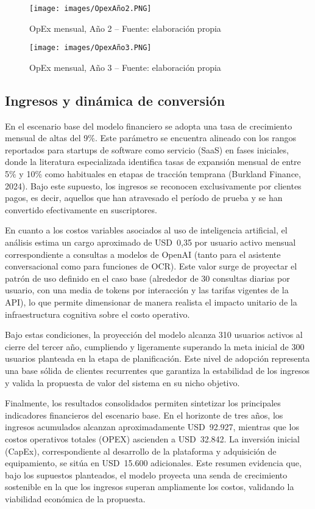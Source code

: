 \begin{figure}[!htbp]
  \centering
  \texttt{[image: images/OpexAño2.PNG]}
  \caption{OpEx mensual, Año 2 -- Fuente: elaboración propia}
  \label{fig:opex-anio2}
\end{figure}

\begin{figure}[!htbp]
  \centering
  \texttt{[image: images/OpexAño3.PNG]}
  \caption{OpEx mensual, Año 3 -- Fuente: elaboración propia}
  \label{fig:opex-anio3}
\end{figure}


\subsection{Ingresos y dinámica de conversión}

En el escenario base del modelo financiero se adopta una tasa de crecimiento mensual de altas del 9\%. Este parámetro se encuentra alineado con los rangos reportados para startups de software como servicio (SaaS) en fases iniciales, donde la literatura especializada identifica tasas de expansión mensual de entre 5\% y 10\% como habituales en etapas de tracción temprana (Burkland Finance, 2024). Bajo este supuesto, los ingresos se reconocen exclusivamente por clientes pagos, es decir, aquellos que han atravesado el período de prueba y se han convertido efectivamente en suscriptores.

En cuanto a los costos variables asociados al uso de inteligencia artificial, el análisis estima un cargo aproximado de USD~0,35 por usuario activo mensual correspondiente a consultas a modelos de OpenAI (tanto para el asistente conversacional como para funciones de OCR). Este valor surge de proyectar el patrón de uso definido en el caso base (alrededor de 30 consultas diarias por usuario, con una media de tokens por interacción y las tarifas vigentes de la API), lo que permite dimensionar de manera realista el impacto unitario de la infraestructura cognitiva sobre el costo operativo.

Bajo estas condiciones, la proyección del modelo alcanza 310 usuarios activos al cierre del tercer año, cumpliendo y ligeramente superando la meta inicial de 300 usuarios planteada en la etapa de planificación. Este nivel de adopción representa una base sólida de clientes recurrentes que garantiza la estabilidad de los ingresos y valida la propuesta de valor del sistema en su nicho objetivo.

Finalmente, los resultados consolidados permiten sintetizar los principales indicadores financieros del escenario base. En el horizonte de tres años, los ingresos acumulados alcanzan aproximadamente USD~92.927, mientras que los costos operativos totales (OPEX) ascienden a USD~32.842. La inversión inicial (CapEx), correspondiente al desarrollo de la plataforma y adquisición de equipamiento, se sitúa en USD~15.600 adicionales. Este resumen evidencia que, bajo los supuestos planteados, el modelo proyecta una senda de crecimiento sostenible en la que los ingresos superan ampliamente los costos, validando la viabilidad económica de la propuesta.


